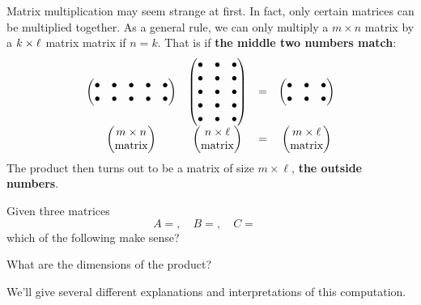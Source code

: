\documentclass{ximera}
\begin{document}
Matrix multiplication may seem strange at first. In fact, only certain
matrices can be multiplied together. As a general rule, we can only
multiply a $m \times n$ matrix by a $k \times \ell$ matrix matrix if
$n=k$. That is if \textbf{the middle two numbers match}:
\[
\begin{matrix}
\begin{pmatrix}
    \bullet & \bullet & \bullet & \bullet & \bullet\\
    \bullet & \bullet & \bullet & \bullet & \bullet\\
\end{pmatrix}
&
\begin{pmatrix}
    \bullet & \bullet &\bullet \\\bullet & \bullet & \bullet \\  \bullet & \bullet & \bullet \\\bullet & \bullet & \bullet \\ \bullet & \bullet & \bullet \end{pmatrix} &= &
\begin{pmatrix}
  \bullet & \bullet &\bullet \\\bullet & \bullet &  \bullet
\end{pmatrix}\\
\begin{pmatrix}
  m\times n\\
  \text{matrix}
\end{pmatrix} &
\begin{pmatrix}
  n\times \ell\\
  \text{matrix}
\end{pmatrix} 
&= & \begin{pmatrix}
  m\times \ell\\
  \text{matrix}
\end{pmatrix}
\end{matrix}
\]
The product then turns out to be a matrix of size $m\times \ell$, \textbf{the
outside numbers}.

\begin{question}
  Given three matrices 
  \[
  A =,\quad B =, \quad C =\quad 
  \]
  which of the following make sense?
  \begin{selectAll}
  \end{selectAll}
  What are the dimensions of the product?
\end{question}


We'll give several different explanations and interpretations of this
computation.
\end{document}
